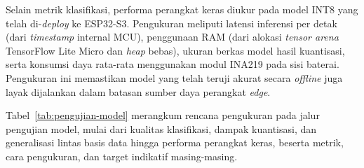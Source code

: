 Selain metrik klasifikasi, performa perangkat keras diukur pada model INT8 yang telah di-\textit{deploy} ke ESP32-S3. Pengukuran meliputi latensi inferensi per detak (dari \textit{timestamp} internal MCU), penggunaan RAM (dari alokasi \textit{tensor arena} TensorFlow Lite Micro dan \textit{heap} bebas), ukuran berkas model hasil kuantisasi, serta konsumsi daya rata-rata menggunakan modul INA219 pada sisi baterai. Pengukuran ini memastikan model yang telah teruji akurat secara \textit{offline} juga layak dijalankan dalam batasan sumber daya perangkat \textit{edge}.

Tabel~\ref{tab:pengujian-model} merangkum rencana pengukuran pada jalur pengujian model, mulai dari kualitas klasifikasi, dampak kuantisasi, dan generalisasi lintas basis data hingga performa perangkat keras, beserta metrik, cara pengukuran, dan target indikatif masing-masing.

